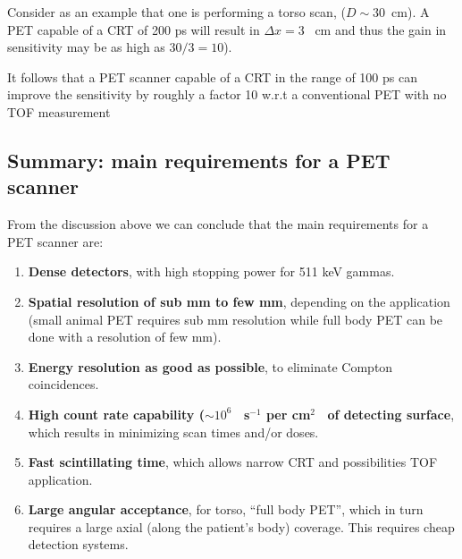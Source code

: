 Consider as an example that one is performing a torso scan, ($D \sim 30$~cm). A PET capable of a CRT of 200 ps will result in $\Delta x = 3$~ cm and thus the gain in sensitivity may be as high as $30/3 = 10$). 
  
It follows that a PET scanner capable of a CRT in the range of 100 ps can improve the sensitivity by roughly a factor 10 w.r.t a conventional PET with no TOF measurement 


\subsection{Summary: main requirements for a PET scanner}

From the discussion above we can conclude that the 
main requirements for a PET scanner are: 

\begin{enumerate}
\item {\bf Dense detectors}, with high stopping power for 511 keV gammas.
\item {\bf Spatial resolution of sub mm to few mm}, depending on the application (small animal PET requires sub mm resolution while full body PET can be done with a resolution of few mm).
\item {\bf Energy resolution as good as possible}, to eliminate Compton coincidences.
\item {\bf High count rate capability ($\sim10^6$~ s$^{-1}$ per cm$^2$~ of detecting surface}, which results in minimizing scan times and/or doses.
\item {\bf Fast scintillating time}, which allows narrow CRT and possibilities TOF application. 
\item {\bf Large angular acceptance}, for torso, ``full body PET'', which in turn requires a large axial (along the patient's body) coverage. This requires cheap detection systems. 
\end{enumerate}